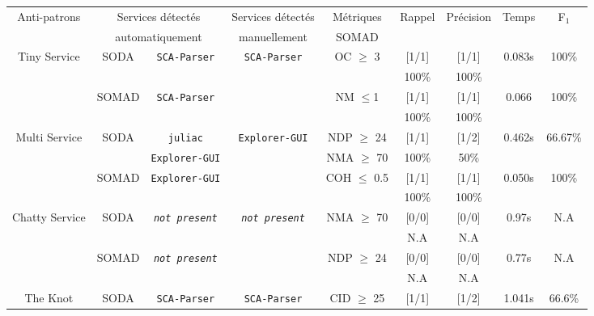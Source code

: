 \begin{table*}
\centering{}\centering{}%
\begin{tabular}{|c|c|c|c|c|c|c|c|c|}
\hline 
\multirow{2}{*}{Anti-patrons} & \multicolumn{2}{c|}{Services détectés} & Services détectés & Métriques & \multirow{2}{*}{Rappel} & \multirow{2}{*}{Précision } & \multirow{2}{*}{Temps} & \multirow{2}{*}{F$_{1}$}\tabularnewline
 & \multicolumn{2}{c|}{automatiquement}  & manuellement  & SOMAD & & & & \tabularnewline
\hline 
\hline 
\multirow{4}{*}{Tiny Service}  & \multirow{2}{*}{SODA}  & \multirow{2}{*}{\texttt{SCA-Parser}} & \multirow{4}{*}{\texttt{SCA-Parser} } & \multirow{2}{*}{OC $\geqslant$ 3 }  & {[}1/1{]}  & {[}1/1{]}  & \multirow{2}{*}{0.083s}  & \multirow{2}{*}{100\%}\tabularnewline
 &  &  &  &  & 100\%  & 100\%  &  & \tabularnewline
\cline{2-3} \cline{6-9} 
 & \multirow{2}{*}{SOMAD}  & \multirow{2}{*}{\texttt{SCA-Parser}} &  & \multirow{2}{*}{NM $\leqslant$1 }  & {[}1/1{]}  & {[}1/1{]}  & \multirow{2}{*}{0.066 }  & \multirow{2}{*}{100\%}\tabularnewline
 &  &  &  &  & 100\%  & 100\%  &  & \tabularnewline
\hline 
\hline 
\multirow{4}{*}{Multi Service }  & \multirow{2}{*}{SODA}  & \texttt{juliac} & \multirow{4}{*}{\texttt{Explorer-GUI}} & NDP $\geqslant$ 24 & {[}1/1{]}  & {[}1/2{]}  & \multirow{2}{*}{0.462s}  & \multirow{2}{*}{66.67\% }\tabularnewline
 &  & \texttt{Explorer-GUI} &  & NMA $\geqslant$ 70 & 100\%  & 50\%  &  & \tabularnewline
\cline{2-3} \cline{6-9} 
 & \multirow{2}{*}{SOMAD}  & \multirow{2}{*}{\texttt{Explorer-GUI}} &  & \multirow{2}{*}{COH $\leqslant$ 0.5 }  & {[}1/1{]}  & {[}1/1{]}  & \multirow{2}{*}{0.050s}  & \multirow{2}{*}{100\% }\tabularnewline
 &  &  &  &  & 100\%  & 100\%  &  & \tabularnewline
\hline 
\hline 
\multirow{4}{*}{Chatty Service}  & \multirow{2}{*}{SODA}  & \multirow{2}{*}{\texttt{\emph{not present}}} & \multirow{4}{*}{\texttt{\emph{not present}}} & \multirow{2}{*}{NMA $\geqslant$ 70}  & {[}0/0{]}  & {[}0/0{]}  & \multirow{2}{*}{0.97s}  & \multirow{2}{*}{N.A}\tabularnewline
 &  &  &  &  & N.A  & N.A  &  & \tabularnewline
\cline{2-3} \cline{6-9} 
 & \multirow{2}{*}{SOMAD}  & \multirow{2}{*}{\texttt{\emph{not present}}} &  & \multirow{2}{*}{NDP $\geqslant$ 24 }  & {[}0/0{]}  & {[}0/0{]}  & \multirow{2}{*}{0.77s}  & \multirow{2}{*}{N.A}\tabularnewline
 &  &  &  &  & N.A  & N.A  &  & \tabularnewline
\hline 
\hline 
\multirow{4}{*}{The Knot}  & \multirow{2}{*}{SODA}  & \multicolumn{1}{c|}{\texttt{SCA-Parser}} & \multirow{4}{*}{\texttt{SCA-Parser}}  & \multirow{2}{*}{CID $\geqslant$ 25 }  & {[}1/1{]}  & {[}1/2{]}  & \multirow{2}{*}{1.041s}  & \multirow{2}{*}{66.6\% }\tabularnewline

\end{tabular}
\end{table*}
